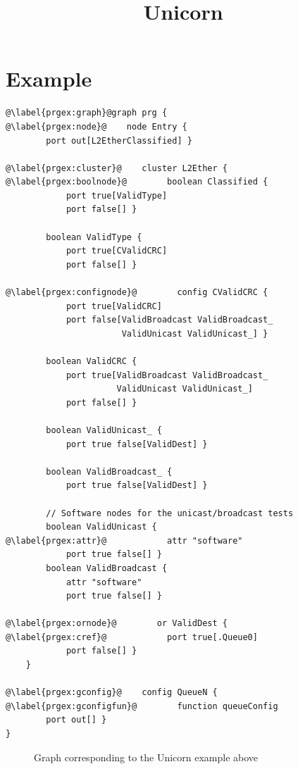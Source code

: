 \documentclass[a4paper]{article}
\title{Unicorn}
\date{}
\author{}
\begin{document}
\maketitle

\section*{Example}
\begin{lstlisting}
@\label{prgex:graph}@graph prg {
@\label{prgex:node}@    node Entry {
        port out[L2EtherClassified] }

@\label{prgex:cluster}@    cluster L2Ether {
@\label{prgex:boolnode}@        boolean Classified {
            port true[ValidType]
            port false[] }

        boolean ValidType {
            port true[CValidCRC]
            port false[] }

@\label{prgex:confignode}@        config CValidCRC {
            port true[ValidCRC]
            port false[ValidBroadcast ValidBroadcast_
                       ValidUnicast ValidUnicast_] }

        boolean ValidCRC {
            port true[ValidBroadcast ValidBroadcast_
                      ValidUnicast ValidUnicast_]
            port false[] }

        boolean ValidUnicast_ {
            port true false[ValidDest] }

        boolean ValidBroadcast_ {
            port true false[ValidDest] }

        // Software nodes for the unicast/broadcast tests
        boolean ValidUnicast {
@\label{prgex:attr}@            attr "software"
            port true false[] }
        boolean ValidBroadcast {
            attr "software"
            port true false[] }

@\label{prgex:ornode}@        or ValidDest {
@\label{prgex:cref}@            port true[.Queue0]
            port false[] }
    }

@\label{prgex:gconfig}@    config QueueN {
@\label{prgex:gconfigfun}@        function queueConfig
        port out[] }
}
\end{lstlisting}

\begin{figure}[h]
\noindent{}
\caption{Graph corresponding to the Unicorn example above}
\label{fig:exfig}
\end{figure}
\end{document}
